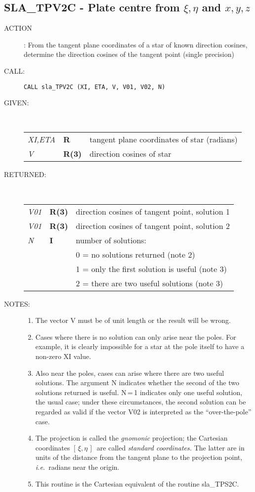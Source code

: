 \documentclass[11pt,twoside]{article}
\newcommand{\xlabel}[1]{}
\newcommand{\xieta}     {$[\,\xi,\eta\,]$}
\newcommand{\routine}[3]
{\hbadness=10000
  \vbox
  {
    \rule{\textwidth}{0.3mm}\\
    {\Large {\bf #1} \hfill #2 \hfill {\bf #1}}\\
    \setlength{\oldspacing}{\topsep}
    \setlength{\topsep}{0.3ex}
    \begin{description}
      #3
    \end{description}
    \setlength{\topsep}{\oldspacing}
  }
}
\renewcommand{\routine}[3]
   {
      \subsection{#1\xlabel{#1} - #2\label{#1}}
       \begin{description}
         #3
       \end{description}
   }
\newcommand{\action}[1]
{\item[ACTION]: #1}
\newcommand{\action}[1]
   {\item[ACTION:] #1}
\newcommand{\call}[1]
{\item[CALL]: \hspace{0.4em}{\tt #1}}
\newlength{\oldspacing}
\renewcommand{\call}[1]
   {
    \item[CALL:] {\tt #1}
   }
\newcommand{\args}[2]
{
  \goodbreak
  \setlength{\oldspacing}{\topsep}
  \setlength{\topsep}{0.3ex}
  \begin{description}
  \item[#1]:\\[1.5ex]
    \begin{tabular}{p{7em}p{6em}p{22em}}
      #2
    \end{tabular}
  \end{description}
  \setlength{\topsep}{\oldspacing}
}
\renewcommand{\args}[2]
   {
     \begin{description}
        \item[#1:]\\
        \begin{tabular}{p{7em}p{6em}l}
           #2
        \end{tabular}
     \end{description}
   }
\newcommand{\spec}[3]
{
  {\em {#1}} & {\bf \mbox{#2}} & {#3}
}
\newcommand{\notes}[1]
{
  \goodbreak
  \setlength{\oldspacing}{\topsep}
  \setlength{\topsep}{0.3ex}
  \begin{description}
    \item[NOTES]:
        #1
  \end{description}
  \setlength{\topsep}{\oldspacing}
}
\renewcommand{\notes}[1]
   {
      \begin{description}
         \item[NOTES:]
            #1
      \end{description}
   }
\begin{document}
\routine{SLA\_TPV2C}{Plate centre from $\xi,\eta$ and $x,y,z$}
{
 \action{From the tangent plane coordinates of a star of known
         direction cosines, determine the direction cosines
         of the tangent point (single precision)}
 \call{CALL sla\_TPV2C (XI, ETA, V, V01, V02, N)}
}
\args{GIVEN}
{
 \spec{XI,ETA}{R}{tangent plane coordinates of star (radians)} \\
 \spec{V}{R(3)}{direction cosines of star}
}
\args{RETURNED}
{
 \spec{V01}{R(3)}{direction cosines of tangent point, solution 1} \\
 \spec{V01}{R(3)}{direction cosines of tangent point, solution 2} \\
 \spec{N}{I}{number of solutions:} \\
 \spec{}{}{\hspace{1em} 0 = no solutions returned  (note 2)} \\
 \spec{}{}{\hspace{1em} 1 = only the first solution is useful (note 3)} \\
 \spec{}{}{\hspace{1em} 2 = there are two useful solutions (note 3)}
}
\notes
{
 \begin{enumerate}
  \item The vector V must be of unit length or the result will be wrong.
  \item Cases where there is no solution can only arise near the poles.
        For example, it is clearly impossible for a star at the pole
        itself to have a non-zero XI value.
  \item Also near the poles, cases can arise where there are two useful
        solutions.  The argument N indicates whether the second of the
        two solutions returned is useful.
        N\,=\,1
        indicates only one useful solution, the usual case;  under these
        circumstances, the second solution can be regarded as valid if
        the vector V02 is interpreted as the ``over-the-pole'' case.
  \item The projection is called the {\it gnomonic}\/ projection;  the
        Cartesian coordinates \xieta\ are called 
        {\it standard coordinates.}\/  The latter
        are in units of the distance from the tangent plane to the projection
        point, {\it i.e.}\ radians near the origin.
  \item This routine is the Cartesian equivalent of the routine sla\_TPS2C.
 \end{enumerate}
}
\end{document}
